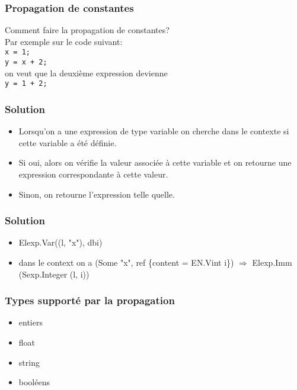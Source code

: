 \documentclass{beamer}
\begin{document}
\begin{frame}
\frametitle{Propagation de constantes}
Comment faire la propagation de constantes?\\
Par exemple sur le code suivant:\\
\bigskip
\quad\texttt{x = 1;}\\
\quad\texttt{y = x + 2;}\\
\bigskip
on veut que la deuxième expression devienne \\
\quad\texttt{y = 1 + 2;}\\

\end{frame}
\begin{frame}
\frametitle{Solution}
    \begin{itemize}
        \item Lorsqu'on a une expression de type variable on cherche dans le contexte si cette variable a été définie.
        \item Si oui, alors on vérifie la valeur associée à cette variable et on retourne une expression correspondante à cette valeur.
        \item Sinon, on retourne l'expression telle quelle.
    \end{itemize}
\end{frame}
\begin{frame}
\frametitle{Solution}
    \begin{itemize}
        \item Elexp.Var((l, "x"), dbi)
        \item dans le context on a (Some "x", ref \{content = EN.Vint i\})
        $\Rightarrow$ Elexp.Imm (Sexp.Integer (l, i))
    \end{itemize}

\end{frame}
\begin{frame}
\frametitle{Types supporté par la propagation}
    \begin{itemize}
        \item entiers
        \item float
        \item string
        \item booléens
    \end{itemize}

\end{frame}
\end{document}
